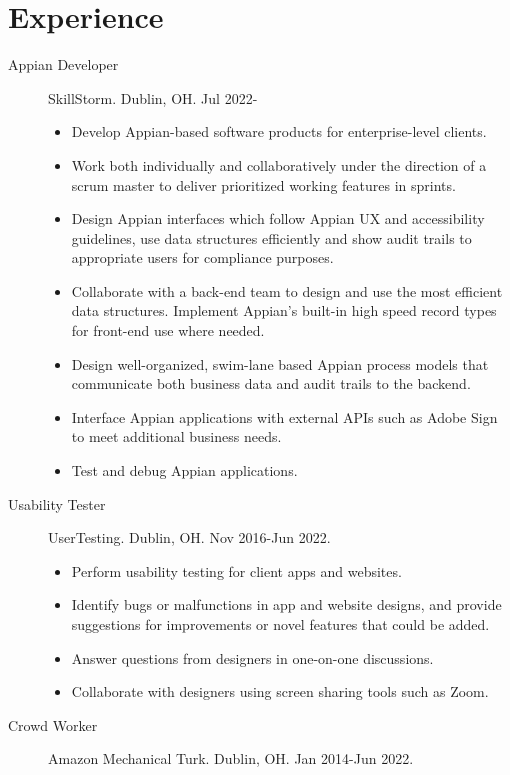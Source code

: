 \documentclass{article}
\begin{document}
\section*{Experience}\vspace{-0.5em}
\begin{description}
  \item[Appian Developer] SkillStorm. Dublin, OH. Jul 2022-
  \begin{itemize}
    \item Develop Appian-based software products for enterprise-level clients.
    \item Work both individually and collaboratively under the direction of a scrum master to deliver prioritized working features in sprints.
    \item Design Appian interfaces which follow Appian UX and accessibility guidelines, use data structures efficiently and show audit trails to appropriate users for compliance purposes.
    \item Collaborate with a back-end team to design and use the most efficient data structures. Implement Appian's built-in high speed record types for front-end use where needed.
    \item Design well-organized, swim-lane based Appian process models that communicate both business data and audit trails to the backend.
    \item Interface Appian applications with external APIs such as Adobe Sign to meet additional business needs.
    \item Test and debug Appian applications.
  \end{itemize}
  \item[Usability Tester] UserTesting. Dublin, OH. Nov 2016-Jun 2022.
  \begin{itemize}
    \item Perform usability testing for client apps and websites.
    \item Identify bugs or malfunctions in app and website designs, and provide suggestions for improvements or novel features that could be added.
    \item Answer questions from designers in one-on-one discussions.
    \item Collaborate with designers using screen sharing tools such as Zoom.
  \end{itemize}  
  \item[Crowd Worker] Amazon Mechanical Turk. Dublin, OH. Jan 2014-Jun 2022.
  \begin{itemize}

\end{itemize}
\end{description}
\end{document}
